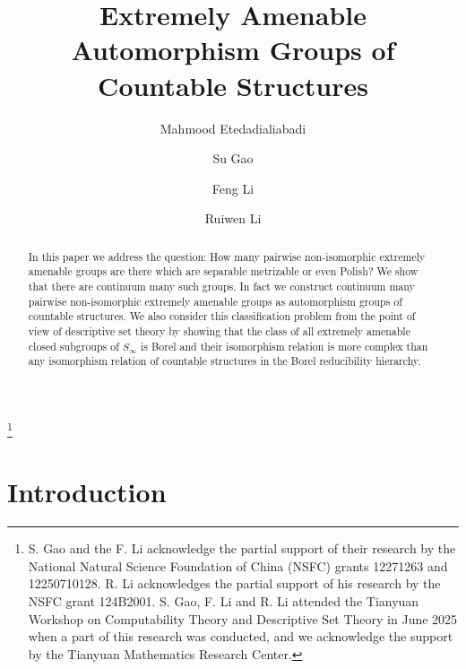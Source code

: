 \documentclass{amsart}
\theoremstyle{definition}
\theoremstyle{remark}
\begin{document}
\title[Extremely Amenable Automorphism Groups]{Extremely Amenable Automorphism Groups of Countable Structures}

\author{Mahmood Etedadialiabadi}
\address{1979 Milky Way, Verona, WI 53593, U.S.A.}

\author{Su Gao}
\address{School of Mathematical Sciences and LPMC, Nankai University, Tianjin 300071, P.R. China}
\thanks{S. Gao and the F. Li acknowledge the partial support of their research by the National Natural Science Foundation of China (NSFC) grants 12271263 and 12250710128. R. Li acknowledges the partial support of his research by the NSFC grant 124B2001. S. Gao, F. Li and R. Li attended the Tianyuan Workshop on Computability Theory and Descriptive Set Theory in June 2025 when a part of this research was conducted, and we acknowledge the support by the Tianyuan Mathematics Research Center.}
\author{Feng Li}
\address{School of Mathematical Sciences and LPMC, Nankai University, Tianjin 300071, P.R. China}

\author{Ruiwen Li}
\address{School of Mathematical Sciences and LPMC, Nankai University, Tianjin 300071, P.R. China}


    
\begin{abstract}  In this paper we address the question: How many pairwise non-isomorphic extremely amenable groups are there which are separable metrizable or even Polish? We show that there are continuum many such groups. In fact we construct continuum many pairwise non-isomorphic extremely amenable groups as automorphism groups of countable structures. We also consider this classification problem from the point of view of descriptive set theory by showing that the class of all extremely amenable closed subgroups of $S_\infty$ is Borel and their isomorphism relation is more complex than any isomorphism relation of countable structures in the Borel reducibility hierarchy. 
\end{abstract}

\maketitle
\section{Introduction}    
\end{document}
